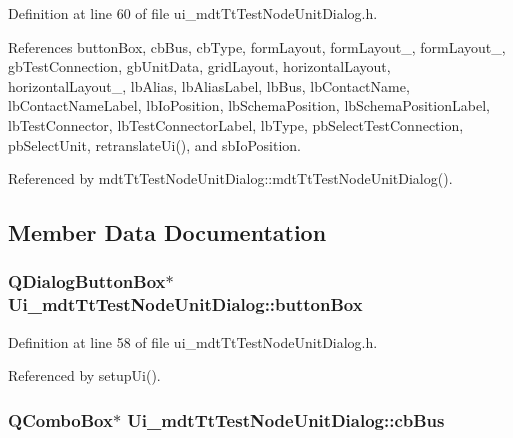 Definition at line 60 of file ui\-\_\-mdt\-Tt\-Test\-Node\-Unit\-Dialog.\-h.



References button\-Box, cb\-Bus, cb\-Type, form\-Layout, form\-Layout\-\_, form\-Layout\-\_, gb\-Test\-Connection, gb\-Unit\-Data, grid\-Layout, horizontal\-Layout, horizontal\-Layout\-\_, lb\-Alias, lb\-Alias\-Label, lb\-Bus, lb\-Contact\-Name, lb\-Contact\-Name\-Label, lb\-Io\-Position, lb\-Schema\-Position, lb\-Schema\-Position\-Label, lb\-Test\-Connector, lb\-Test\-Connector\-Label, lb\-Type, pb\-Select\-Test\-Connection, pb\-Select\-Unit, retranslate\-Ui(), and sb\-Io\-Position.



Referenced by mdt\-Tt\-Test\-Node\-Unit\-Dialog\-::mdt\-Tt\-Test\-Node\-Unit\-Dialog().



\subsection{Member Data Documentation}
\hypertarget{class_ui__mdt_tt_test_node_unit_dialog_a67fc67717c90226a0712221b6ab58393}{
\subsubsection[{button\-Box}]{\setlength{\rightskip}{0pt plus 5cm}Q\-Dialog\-Button\-Box$\ast$ Ui\-\_\-mdt\-Tt\-Test\-Node\-Unit\-Dialog\-::button\-Box}}\label{class_ui__mdt_tt_test_node_unit_dialog_a67fc67717c90226a0712221b6ab58393}


Definition at line 58 of file ui\-\_\-mdt\-Tt\-Test\-Node\-Unit\-Dialog.\-h.



Referenced by setup\-Ui().

\hypertarget{class_ui__mdt_tt_test_node_unit_dialog_a21ccd7c61ed548a5ec40505026d55e23}{
\subsubsection[{cb\-Bus}]{\setlength{\rightskip}{0pt plus 5cm}Q\-Combo\-Box$\ast$ Ui\-\_\-mdt\-Tt\-Test\-Node\-Unit\-Dialog\-::cb\-Bus}}\label{class_ui__mdt_tt_test_node_unit_dialog_a21ccd7c61ed548a5ec40505026d55e23}


